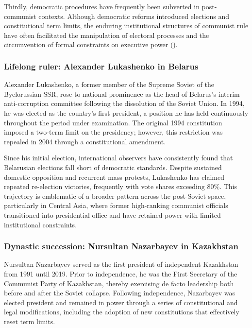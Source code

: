 \documentclass[
  12pt,
]{report}
\begin{document}
Thirdly, democratic procedures have frequently been subverted in
post-communist contexts. Although democratic reforms introduced
elections and constitutional term limits, the enduring institutional
structures of communist rule have often facilitated the manipulation of
electoral processes and the circumvention of formal constraints on
executive power ().

\subsubsection*{Lifelong ruler: Alexander Lukashenko in
Belarus}\label{lifelong-ruler-alexander-lukashenko-in-belarus}

Alexander Lukashenko, a former member of the Supreme Soviet of the
Byelorussian SSR, rose to national prominence as the head of Belarus's
interim anti-corruption committee following the dissolution of the
Soviet Union. In 1994, he was elected as the country's first president,
a position he has held continuously throughout the period under
examination. The original 1994 constitution imposed a two-term limit on
the presidency; however, this restriction was repealed in 2004 through a
constitutional amendment.

Since his initial election, international observers have consistently
found that Belarusian elections fall short of democratic standards.
Despite sustained domestic opposition and recurrent mass protests,
Lukashenko has claimed repeated re-election victories, frequently with
vote shares exceeding \(80\%\). This trajectory is emblematic of a
broader pattern across the post-Soviet space, particularly in Central
Asia, where former high-ranking communist officials transitioned into
presidential office and have retained power with limited institutional
constraints.

\subsubsection*{Dynastic succession: Nursultan Nazarbayev in
Kazakhstan}\label{dynastic-succession-nursultan-nazarbayev-in-kazakhstan}

Nursultan Nazarbayev served as the first president of independent
Kazakhstan from 1991 until 2019. Prior to independence, he was the First
Secretary of the Communist Party of Kazakhstan, thereby exercising de
facto leadership both before and after the Soviet collapse. Following
independence, Nazarbayev was elected president and remained in power
through a series of constitutional and legal modifications, including
the adoption of new constitutions that effectively reset term limits.
\end{document}
